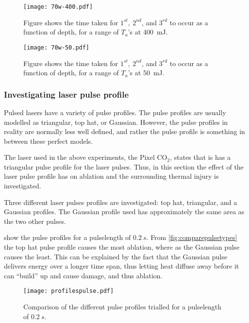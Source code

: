 \begin{figure}[!htbp]
	\centering
	\texttt{[image: 70w-400.pdf]}
	\caption{Figure shows the time taken for $1^{st},\ 2^{nd}$, and $3^{rd}$ to occur as a function of depth, for a range of $T_a$'s at 400~mJ.}
	\label{fig:time-thres1}
\end{figure}	
	\FloatBarrier

\begin{figure}[!htbp]

	\centering
	\texttt{[image: 70w-50.pdf]}
	\caption{Figure shows the time taken for $1^{st},\ 2^{nd}$, and $3^{rd}$ to occur as a function of depth, for a range of $T_a$'s at 50~mJ.}
	\label{fig:time-thres2}
\end{figure}	
\subsubsection*{Investigating laser pulse profile}

Pulsed lasers have a variety of pulse profiles.
The pulse profiles are usually modelled as triangular, top hat, or Gaussian.
However, the pulse profiles in reality are normally less well defined, and rather the pulse profile is something in between these perfect models.

The laser used in the above experiments, the Pixel CO$_2$, states that is has a triangular pulse profile for the laser pulses.
Thus, in this section the effect of the laser pulse profile has on ablation and the surrounding thermal injury is investigated.

Three different laser pulses profiles are investigated: top hat, triangular, and a Gaussian profiles.
The Gaussian profile used has approximately the same area as the two other pulses.

 show the pulse profiles for a pulselength of $0.2~s$.
From \cref{fig:comparepulsetypes} the top hat pulse profile causes the most ablation, where as the Gaussian pulse causes the least.
This can be explained by the fact that the Gaussian pulse delivers energy over a longer time span, thus letting heat diffuse away before it can ``build'' up and cause damage, and thus ablation.

\begin{figure}[!htbp]
	\centering
	\texttt{[image: profilespulse.pdf]}
	\caption{Comparison of the different pulse profiles trialled for a pulselength of $0.2~s$.}
	\label{fig:pulseprofiles}
\end{figure}

